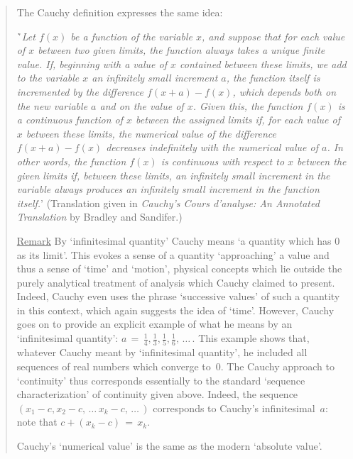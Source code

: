 \begin{quotation}
{\VA

        The Cauchy definition expresses the same idea:

\VA

       \h `{\em Let $f(x)$ be a function of the variable $x$, and suppose that for each value of $x$ between two given limits,
    the function always takes a unique finite value. If, beginning with a value of $x$ contained between these limits,
    we add to the variable $x$ an infinitely small increment $a$, the function itself is incremented by the difference $f(x+a)- f(x)$,
    which depends both on the new variable $a$ and on the value of $x$. Given this,
    the function $f(x)$ is a continuous function of $x$ between the assigned limits if,
    for each value of $x$ between these limits, the numerical value of the difference $f(x+a) - f(x)$
    decreases indefinitely with the numerical value of $a$. In other words, the function $f (x)$ is continuous with respect to $x$ between the given limits if, 
    between these limits, an infinitely small increment in the variable always produces an infinitely small increment in the function itself.}'
    (Translation given in {\em Cauchy's Cours d'analyse: An Annotated Translation} by Bradley and Sandifer.)

\VA

\noindent \underline{Remark} By `infinitesimal quantity' Cauchy means `a quantity which has $0$ as its limit'.
    This evokes a sense of a quantity `approaching' a value and thus a sense of `time' and  `motion',
    physical concepts which lie outside the purely analytical treatment of analysis which Cauchy claimed to present.
    Indeed, Cauchy even uses the phrase `successive values' of such a quantity in this context, which again suggests the idea of `time'.
    However, Cauchy goes on to provide an explicit example of what he means by an `infinitesimal quantity':
    $a \,=\, {\displaystyle \frac{1}{4}, \frac{1}{3}, \frac{1}{5}, \frac{1}{6},\,{\ldots}\,}$.
    This example shows that, whatever Cauchy meant by `infinitesimal quantity', he included all sequences of real numbers which converge to~$0$.
    The Cauchy approach to `continuity' thus corresponds essentially to the standard `sequence characterization' of continuity given above.
    Indeed, the sequence $(x_{1}-c, x_{2}-c,\,{\ldots}\,x_{k}-c, \,{\ldots}\,)$ corresponds to Cauchy's infinitesimal~$a$: note that $c + (x_{k}-c) \,=\, x_{k}$.

        Cauchy's `numerical value' is the same as the modern `absolute value'.

}
\end{quotation}

